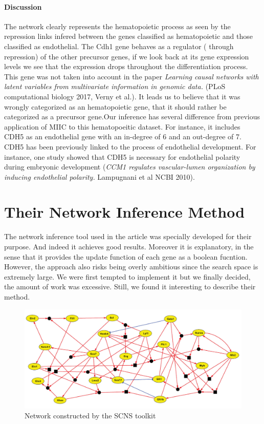 \documentclass[a4paper,12pt]{book}
\theoremstyle{break}
\begin{document}
\paragraph{Discussion }The network clearly represents the hematopoietic process as seen by the repression links  infered between the genes classified as hematopoietic and those classified as endothelial. The Cdh1 gene behaves as a regulator ( through repression) of the other precursor genes, if we look back at its gene expression levels we see that the expression drops throughout the differentiation process. This gene was not taken into account in the paper \textit{Learning causal networks with latent variables from multivariate information in genomic data.} (PLoS computational biology 2017, Verny et al.). It leads us to believe that it was wrongly categorized as an hematopoietic gene, that it should rather be categorized as a precursor gene.Our inference has several difference from previous application of MIIC to this hematopoeitic dataset. For instance, it includes CDH5 as an endothelial gene with an in-degree of 6 and an out-degree of 7. CDH5 has been previously linked to the process of endothelial development. For instance, one study showed that CDH5 is necessary for endothelial polarity during embryonic development (\textit{CCM1 regulates vascular-lumen organization by inducing endothelial polarity.} Lampugnani et al NCBI 2010).

\section*{Their Network Inference Method}

The network inference tool used in the article was specially developed for their purpose. And indeed it achieves good results. Moreover it is explanatory, in the sense that it provides the update function of each gene as a boolean fucntion. However, the approach also risks being overly ambitious since the search space is extremely large. We were first tempted to implement it but we finally decided, the amount of work was excessive. Still, we found it interesting to describe their method.

\begin{figure}[h!]
	\centering
	\includegraphics[width = \linewidth]{../Biblio/images/pap_network.png}
	\caption{Network constructed by the SCNS toolkit}
	\label{fig:scns}
\end{figure}
\end{document}
